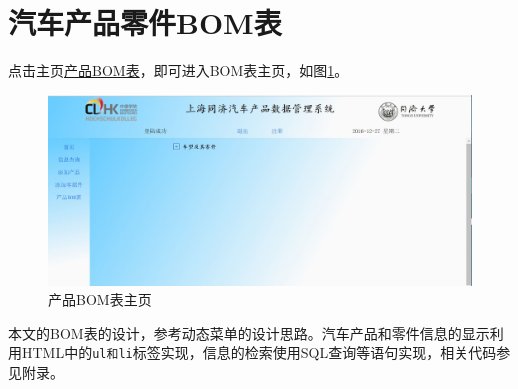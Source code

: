 \section{汽车产品零件BOM表}
点击主页\underline{产品BOM表}，即可进入BOM表主页，如图\ref{fig:PDM_index}。
\begin{figure}[H]
\centering
\includegraphics[width=0.9\linewidth]{figure/PDM_index}
\caption{产品BOM表主页}
\label{fig:PDM_index}
\end{figure}


本文的BOM表的设计，参考动态菜单的设计思路。汽车产品和零件信息的显示利用HTML中的\verb|ul和li|标签实现，信息的检索使用SQL查询等语句实现，相关代码参见附录。


